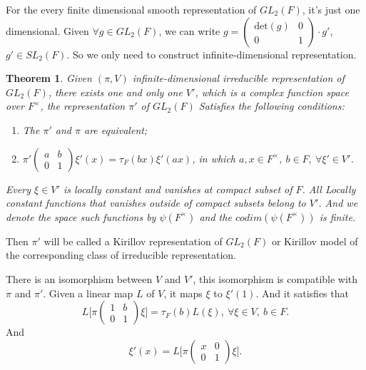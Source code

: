 \documentclass[12pt,a4paper,english]{article}
\theoremstyle{plain}
\newtheorem{thm}{Theorem}[section]
\theoremstyle{definition}
\begin{document}
For the every finite dimensional smooth representation of $GL_{2}(F)$, it's just one dimensional. Given $\forall g\in GL_{2}(F)$, we can write $g=\begin{pmatrix}
\text{det}(g) & 0\\
0 & 1
\end{pmatrix}\cdot  g'$,\ $g'\in SL_{2}(F)$. So we only need to construct infinite-dimensional representation. 
\begin{thm}
Given $(\pi, V)$ infinite-dimensional irreducible representation of $GL_{2}(F)$, there exists one and only one $V'$, which is a complex function space over $F^{\times}$, the representation $\pi'$ of $GL_{2}(F)$ Satisfies the following conditions:
\begin{enumerate}
    \item The $\pi'$ and $\pi$ are equivalent;
    \item $\pi'\begin{pmatrix}
    a& b\\
    0&1
    \end{pmatrix}\xi'(x)=\tau_{F}(bx)\xi'(ax)$, in which $a, x\in F^{\times},\ b\in F,\ \forall\xi'\in V'$.
\end{enumerate}
Every $\xi\in V'$ is locally constant and vanishes at compact subset of $F$. All Locally constant functions that vanishes outside of compact subsets belong to $V'$. And we denote the space such functions by $\psi(F^{\times})$ and the $codim(\psi(F^{\times}))$ is finite. 

\end{thm}
Then $\pi'$ will be called a Kirillov representation of $GL_{2}(F)$ or Kirillov model of the corresponding class of irreducible representation.

There is an isomorphism between $V$ and $V'$, this isomorphism is compatible with $\pi$ and $\pi'$. Given a linear map $L$ of $V$, it maps $\xi$ to $\xi'(1)$. And it satisfies that
\begin{equation*}
    L\bigg[\pi\begin{pmatrix}
    1 & b\\
    0& 1
    \end{pmatrix}\xi\bigg]=\tau_{F}(b)L(\xi),\ \forall\xi\in V,\ b\in F. 
\end{equation*}
And 
\begin{equation*}
    \xi'(x)=L\bigg[\pi\begin{pmatrix}
    x & 0\\
    0&1
    \end{pmatrix}\xi\bigg].
\end{equation*}
\end{document}
